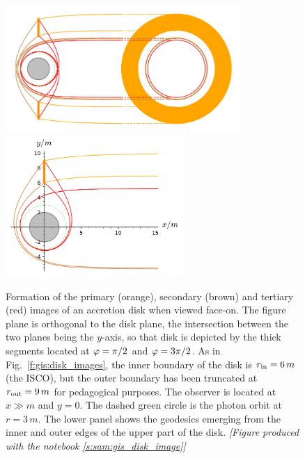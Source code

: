 \begin{figure}
\begin{center}
\includegraphics[width=0.8\textwidth]{gis_disk_image.pdf} \\
\includegraphics[width=0.6\textwidth]{gis_disk_image_detail.pdf}
\end{center}
\caption[]{\label{f:gis:disk_face_on} \footnotesize
Formation of the primary (orange), secondary (brown) and tertiary (red)
images of an accretion disk when viewed face-on. The figure plane
is orthogonal to the disk plane, the intersection between the two planes being
the $y$-axis, so that disk is depicted by the thick segments located at $\varphi=\pi/2$
and $\varphi=3\pi/2$.
As in Fig.~\ref{f:gis:disk_images}, the inner boundary of the disk is
$r_{\rm in} = 6\, m$ (the ISCO), but the outer boundary has been truncated at
$r_{\rm out} = 9\, m$ for pedagogical purposes.
The observer is located at $x\gg m$ and $y=0$.
The dashed green circle is the photon orbit at $r=3\, m$.
The lower panel shows the geodesics emerging from the inner and outer edges
of the upper part of the disk.
\textsl{[Figure produced with the notebook \ref{s:sam:gis_disk_image}]}
}
\end{figure}

